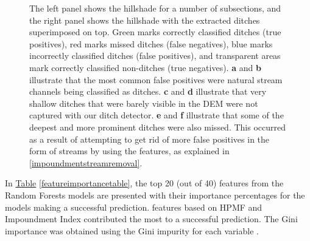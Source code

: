 \documentclass[11pt, review]{elsarticle} %
\begin{document}
\begin{figure} [H]
    \caption{The left panel shows the hillshade for a number of subsections, and the right panel shows the hillshade with the extracted ditches superimposed on top. Green marks correctly classified ditches (true positives), red marks missed ditches (false negatives), blue marks incorrectly classified ditches (false positives), and transparent areas mark correctly classified non-ditches (true negatives). \textbf{a} and \textbf{b} illustrate that the most common false positives were natural stream channels being classified as ditches. \textbf{c} and \textbf{d} illustrate that very shallow ditches that were barely visible in the DEM were not captured with our ditch detector. \textbf{e} and \textbf{f} illustrate that some of the deepest and more prominent ditches were also missed. This occurred as a result of attempting to get rid of more false positives in the form of streams by using the features, as explained in \ref{impoundmentstreamremoval}.}
    \label{fig:resultsillustrations}
\end{figure}

In \hyperref[featureimportancetable]{Table} \ref{featureimportancetable}, the top 20 (out of 40) features from the Random Forests models are presented with their importance percentages for the models making a successful prediction. features based on HPMF and Impoundment Index contributed the most to a successful prediction. The Gini importance was obtained using the Gini impurity for each variable \citep{gini}.
\end{document}
